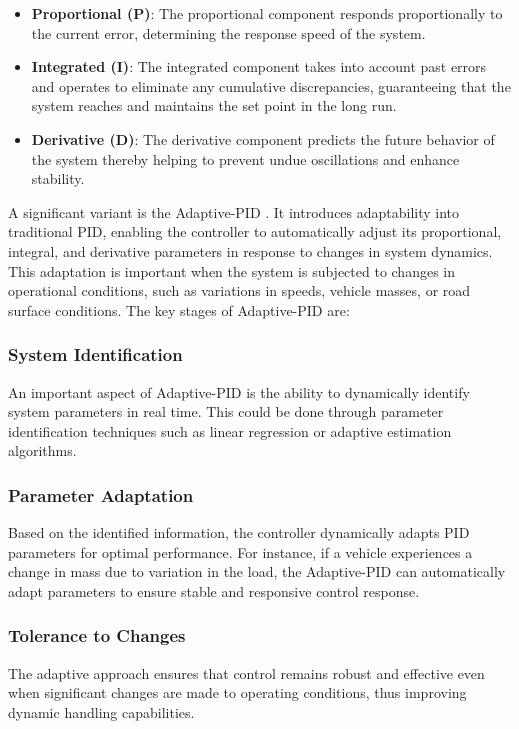 \documentclass[conference]{IEEEtran}
\begin{document}
\begin{itemize}
    \item \textbf{Proportional (P)}: The proportional component responds proportionally to the current error, determining the response speed of the system.

    \item \textbf{Integrated (I)}: The integrated component takes into account past errors and operates to eliminate any cumulative discrepancies, guaranteeing that the system reaches and maintains the set point in the long run.

    \item \textbf{Derivative (D)}: The derivative component predicts the future behavior of the system thereby helping to prevent undue oscillations and enhance stability.

\end{itemize}

A significant variant is the Adaptive-PID \cite{ADAPTIVE_PID}.
%
It introduces adaptability into traditional PID, enabling the controller to automatically adjust its proportional, integral, and derivative parameters in response to changes in system dynamics.
%
This adaptation is important when the system is subjected to changes in operational conditions, such as variations in speeds, vehicle masses, or road surface conditions.
%
The key stages of Adaptive-PID are:

\subsubsection{System Identification}
An important aspect of Adaptive-PID is the ability to dynamically identify system parameters in real time.
%
This could be done through parameter identification techniques such as linear regression or adaptive estimation algorithms.

\subsubsection{Parameter Adaptation}
Based on the identified information, the controller dynamically adapts PID parameters for optimal performance.
%
For instance, if a vehicle experiences a change in mass due to variation in the load, the Adaptive-PID can automatically adapt parameters to ensure stable and responsive control response.

\subsubsection{Tolerance to Changes}
The adaptive approach ensures that control remains robust and effective even when significant changes are made to operating conditions, thus improving dynamic handling capabilities.
\end{document}
